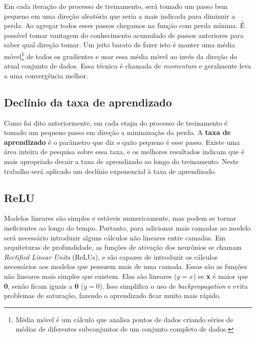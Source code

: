 Em cada iteração do processo de treinamento, será tomado um passo bem
pequeno em uma direção aleatória que seria a mais indicada para
diminuir a perda. Ao agregar todos esses passos chegamos na função
com perda mínima. É possível tomar vantagem do conhecimento acumulado
de passos anteriores para saber qual direção tomar. Um jeito barato de
fazer isto é manter uma média móvel\footnote{Média móvel é um cálculo
  que analisa pontos de dados criando séries de médias de diferentes
  subconjuntos de um conjunto completo de dados.} de todos os
gradientes e usar essa média móvel ao invés da direção do atual
conjunto de dados. Essa técnica é chamada de \textit{momentum}
\cite{Goodfellow-et-al-2016-Book} e geralmente leva a uma convergência
melhor.

\subsection{Declínio da taxa de aprendizado}

Como foi dito anteriormente, em cada etapa do processo de treinamento
é tomado um pequeno passo em direção a minimização da perda. A {\bf
  taxa de aprendizado} é o parâmetro que diz o quão pequeno é esse
passo. Existe uma área inteira de pesquisa sobre essa taxa, e os
melhores resultados indicam que é mais apropriado decair a taxa de
aprendizado ao longo do treinamento. Neste trabalho será aplicado
um declínio exponencial à taxa de aprendizado\cite{Zeiler}.

\subsection{ReLU}

Modelos lineares são simples e estáveis numericamente, mas podem se
tornar ineficientes ao longo do tempo. Portanto, para adicionar mais
camadas ao modelo será necessário introduzir alguns cálculos
não lineares entre camadas. Em arquiteturas de profundidade, as
funções de ativação dos neurônios se chamam \textit{Rectified Linear
  Units} (ReLUs)\cite{Goodfellow-et-al-2016-Book}, e são capazes de
introduzir os cálculos necessários aos modelos que possuem mais de uma
camada. Essas são as funções não lineares mais simples que
existem. Elas são lineares ($y=x$) se {\bf x} é maior que {\bf 0},
senão ficam iguais a {\bf 0} ($y=0$). Isso simplifica o uso de
\textit{backpropagation} e evita problemas de saturação, fazendo o
aprendizado ficar muito mais rápido.

